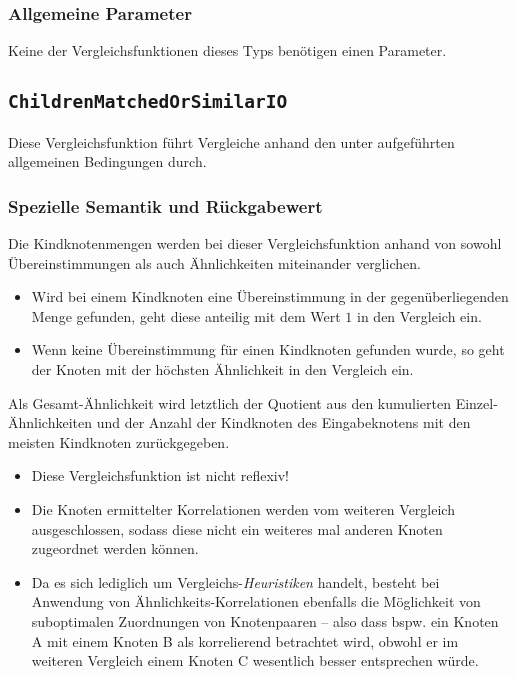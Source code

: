\subsubsection*{Allgemeine Parameter}
Keine der Vergleichsfunktionen dieses Typs benötigen einen Parameter.


\newpage
%
%
\subsection{\texttt{ChildrenMatchedOrSimilarIO}}
Diese Vergleichsfunktion führt Vergleiche anhand den unter  aufgeführten allgemeinen Bedingungen durch.

\subsubsection*{Spezielle Semantik und Rückgabewert}
Die Kindknotenmengen werden bei dieser Vergleichsfunktion anhand von sowohl Übereinstimmungen als auch Ähnlichkeiten miteinander verglichen.
\begin{itemize}
	\item Wird bei einem Kindknoten eine Übereinstimmung in der gegenüberliegenden Menge gefunden, geht diese anteilig mit dem Wert $1$ in den Vergleich ein.
	\item Wenn keine Übereinstimmung für einen Kindknoten gefunden wurde, so geht der Knoten mit der höchsten Ähnlichkeit in den Vergleich ein.
\end{itemize}

Als Gesamt-Ähnlichkeit wird letztlich der Quotient aus den kumulierten Einzel-Ähnlichkeiten und der Anzahl der Kindknoten des Eingabeknotens mit den meisten Kindknoten zurückgegeben.

\begin{itemize}
	\item Diese Vergleichsfunktion ist nicht reflexiv!
	\item Die Knoten ermittelter Korrelationen werden vom weiteren Vergleich ausgeschlossen, sodass diese nicht ein weiteres mal anderen Knoten zugeordnet werden können.
	\item Da es sich lediglich um Vergleichs-\emph{Heuristiken} handelt, besteht bei Anwendung von Ähnlich\-keits-Korrelationen ebenfalls die Möglichkeit von suboptimalen Zuordnungen von Knotenpaaren -- also dass bspw. ein Knoten A mit einem Knoten B als korrelierend betrachtet wird, obwohl er im weiteren Vergleich einem Knoten C wesentlich besser entsprechen würde.
\end{itemize}

